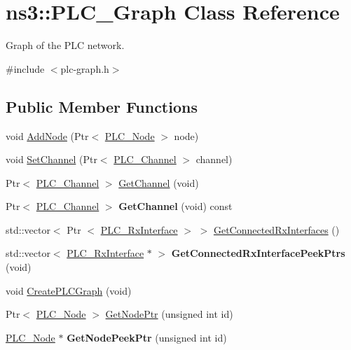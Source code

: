 \hypertarget{classns3_1_1PLC__Graph}{\section{ns3\-:\-:\-P\-L\-C\-\_\-\-Graph \-Class \-Reference}
\label{classns3_1_1PLC__Graph}
}


\-Graph of the \-P\-L\-C network.  




{\ttfamily \#include $<$plc-\/graph.\-h$>$}

\subsection*{\-Public \-Member \-Functions}
\begin{DoxyCompactItemize}
\item 
void \hyperlink{classns3_1_1PLC__Graph_a1bdc6900ab0e1744bde930c67f13b561}{\-Add\-Node} (\-Ptr$<$ \hyperlink{classns3_1_1PLC__Node}{\-P\-L\-C\-\_\-\-Node} $>$ node)
\item 
void \hyperlink{classns3_1_1PLC__Graph_a74c846e5f691f681f901704af755df0b}{\-Set\-Channel} (\-Ptr$<$ \hyperlink{classns3_1_1PLC__Channel}{\-P\-L\-C\-\_\-\-Channel} $>$ channel)
\item 
\-Ptr$<$ \hyperlink{classns3_1_1PLC__Channel}{\-P\-L\-C\-\_\-\-Channel} $>$ \hyperlink{classns3_1_1PLC__Graph_a0e801b209261229e434348f3ac0eabbe}{\-Get\-Channel} (void)
\item 
\hypertarget{classns3_1_1PLC__Graph_ac98fb34a0fbd84616b58ca1d549c96f9}{\-Ptr$<$ \hyperlink{classns3_1_1PLC__Channel}{\-P\-L\-C\-\_\-\-Channel} $>$ {\bfseries \-Get\-Channel} (void) const }\label{classns3_1_1PLC__Graph_ac98fb34a0fbd84616b58ca1d549c96f9}

\item 
std\-::vector$<$ \-Ptr\*
$<$ \hyperlink{classns3_1_1PLC__RxInterface}{\-P\-L\-C\-\_\-\-Rx\-Interface} $>$ $>$ \hyperlink{classns3_1_1PLC__Graph_a7a73879c31ec3aa3f8cf198379c57ada}{\-Get\-Connected\-Rx\-Interfaces} ()
\item 
\hypertarget{classns3_1_1PLC__Graph_a7f033b5c9863275754673c662a3f537e}{std\-::vector$<$ \hyperlink{classns3_1_1PLC__RxInterface}{\-P\-L\-C\-\_\-\-Rx\-Interface} $\ast$ $>$ {\bfseries \-Get\-Connected\-Rx\-Interface\-Peek\-Ptrs} (void)}\label{classns3_1_1PLC__Graph_a7f033b5c9863275754673c662a3f537e}

\item 
void \hyperlink{classns3_1_1PLC__Graph_ae319e64246156050fd7c19f165db1993}{\-Create\-P\-L\-C\-Graph} (void)
\item 
\-Ptr$<$ \hyperlink{classns3_1_1PLC__Node}{\-P\-L\-C\-\_\-\-Node} $>$ \hyperlink{classns3_1_1PLC__Graph_acf496c2f3fa3e095174352b3b7a53f71}{\-Get\-Node\-Ptr} (unsigned int id)
\item 
\hypertarget{classns3_1_1PLC__Graph_a0fccd6eef8e9af5305372bce6c347a35}{\hyperlink{classns3_1_1PLC__Node}{\-P\-L\-C\-\_\-\-Node} $\ast$ {\bfseries \-Get\-Node\-Peek\-Ptr} (unsigned int id)}\label{classns3_1_1PLC__Graph_a0fccd6eef8e9af5305372bce6c347a35}


\end{DoxyCompactItemize}
